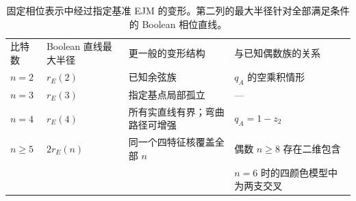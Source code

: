 \begin{table}[t]
\caption{固定相位表示中经过指定基准 EJM 的变形。第二列的最大半径针对全部满足条件的 Boolean 相位直线。}
\label{tab:summary}
\setlength{\tabcolsep}{3pt}
\begin{ruledtabular}
\begin{tabular}{p{}p{}p{}p{}}
比特数 & Boolean 直线最大半径 & 更一般的变形结构 & 与已知偶数族的关系\\
$n=2$ & $r_E(2)$ & 已知余弦族 & $q_A$ 的空乘积情形\\
$n=3$ & $r_E(3)$ & 指定基点局部孤立 & ---\\
$n=4$ & $r_E(4)$ & 所有实直线有界；弯曲路径可增强 & $q_A=1-z_2$\\
$n\ge5$ & $2r_E(n)$ & 同一个四特征核覆盖全部 $n$ & 偶数 $n\ge8$ 存在二维包含\\
 & & & $n=6$ 时的四颜色模型中为两支交叉
\end{tabular}
\end{ruledtabular}
\end{table}
